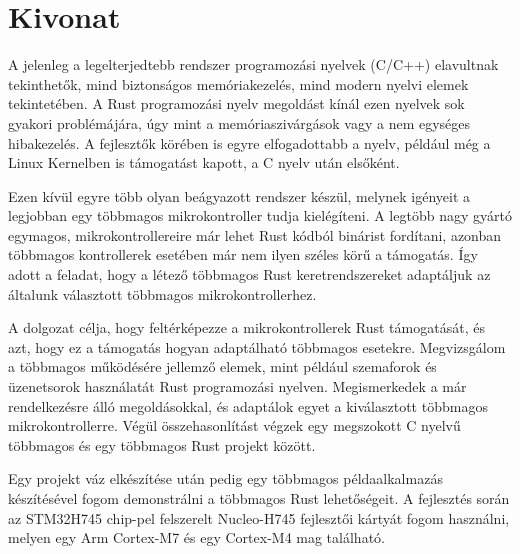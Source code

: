 \setcounter{page}{1}

\selecthungarian

\chapter*{Kivonat}

A jelenleg a legelterjedtebb rendszer programozási nyelvek (C/C++) elavultnak tekinthetők, mind biztonságos memóriakezelés, mind modern nyelvi elemek tekintetében. A Rust programozási nyelv megoldást kínál ezen nyelvek sok gyakori problémájára, úgy mint a memóriaszivárgások vagy a nem egységes hibakezelés. A fejlesztők körében is egyre elfogadottabb a nyelv, például még a Linux Kernelben is támogatást kapott, a C nyelv után elsőként.\cite{FirstRustCommit}

Ezen kívül egyre több olyan beágyazott rendszer készül, melynek igényeit a legjobban egy többmagos mikrokontroller tudja kielégíteni. A legtöbb nagy gyártó egymagos, mikrokontrollereire már lehet Rust kódból binárist fordítani, azonban többmagos kontrollerek esetében már nem ilyen széles körű a támogatás. Így adott a feladat, hogy a létező többmagos Rust keretrendszereket adaptáljuk az általunk választott többmagos mikrokontrollerhez.

A dolgozat célja, hogy feltérképezze a mikrokontrollerek Rust támogatását, és azt, hogy ez a támogatás hogyan adaptálható többmagos esetekre. Megvizsgálom a többmagos működésére jellemző elemek, mint például szemaforok és üzenetsorok használatát Rust programozási nyelven. Megismerkedek a már rendelkezésre álló megoldásokkal, és adaptálok egyet a kiválasztott többmagos mikrokontrollerre. Végül összehasonlítást végzek egy megszokott C nyelvű többmagos és egy többmagos Rust projekt között.

Egy projekt váz elkészítése után pedig egy többmagos példaalkalmazás készítésével fogom demonstrálni a többmagos Rust lehetőségeit. A fejlesztés során az STM32H745 chip-pel felszerelt Nucleo-H745 fejlesztői kártyát fogom használni, melyen egy Arm Cortex-M7 és egy Cortex-M4 mag található.

\vfill
\selectenglish


